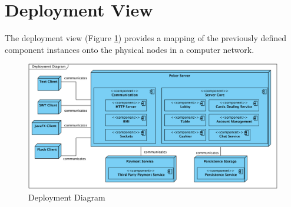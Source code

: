\documentclass[a4paper,11pt]{report}
\begin{document}
\section{Deployment View}
The deployment view (Figure \ref{fig:deployment}) provides a mapping of the previously defined component instances onto the physical nodes in a computer network. 
\begin{figure}
  \begin{center}
    \includegraphics[angle=90, scale=0.6]{img_deployment_diagram.png}
  \end{center}
  \caption{Deployment Diagram}\label{fig:deployment}
\end{figure}
\end{document}
